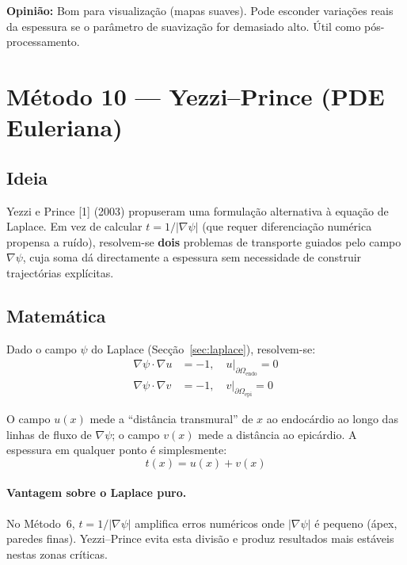 \documentclass[a4paper,12pt]{article}
\begin{document}
\noindent\textbf{Opinião:} Bom para visualização (mapas suaves). Pode
esconder variações reais da espessura se o parâmetro de suavização
for demasiado alto. Útil como pós-processamento.

\section{Método 10 --- Yezzi--Prince (PDE Euleriana)}
\label{sec:yezzi}

\subsection{Ideia}
Yezzi e Prince [1] (2003) propuseram uma formulação alternativa à equação de
Laplace. Em vez de calcular $t = 1/|\nabla\psi|$ (que requer diferenciação
numérica propensa a ruído), resolvem-se \textbf{dois} problemas de
transporte guiados pelo campo $\nabla\psi$, cuja soma dá directamente
a espessura sem necessidade de construir trajectórias explícitas.

\subsection{Matemática}
Dado o campo $\psi$ do Laplace (Secção~\ref{sec:laplace}), resolvem-se:
\begin{align}
  \nabla\psi \cdot \nabla u &= -1, \quad u\big|_{\partial\Omega_{\text{endo}}} = 0 \\
  \nabla\psi \cdot \nabla v &= -1, \quad v\big|_{\partial\Omega_{\text{epi}}} = 0
\end{align}

O campo $u(x)$ mede a ``distância transmural'' de $x$ ao endocárdio ao
longo das linhas de fluxo de $\nabla\psi$; o campo $v(x)$ mede a
distância ao epicárdio. A espessura em qualquer ponto é simplesmente:
\begin{equation}
  t(x) = u(x) + v(x)
\end{equation}

\paragraph{Vantagem sobre o Laplace puro.}
No Método~6, $t = 1/|\nabla\psi|$ amplifica erros numéricos onde
$|\nabla\psi|$ é pequeno (ápex, paredes finas). Yezzi--Prince evita
esta divisão e produz resultados mais estáveis nestas zonas críticas.
\end{document}
